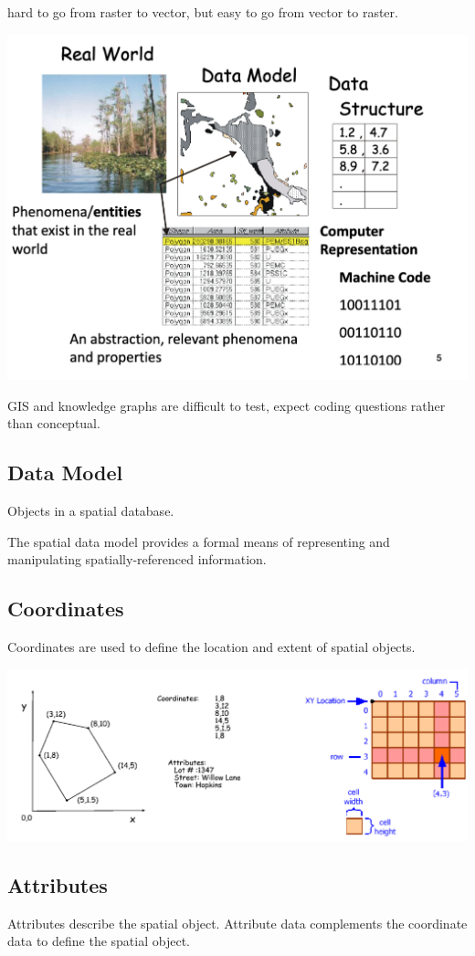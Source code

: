 \documentclass[11pt]{article}
\theoremstyle{definition}
\begin{document}
hard to go from raster to vector, but easy to go from vector to raster.

\includegraphics[width=\textwidth/2]{3.png}

GIS and knowledge graphs are difficult to test, expect coding questions rather than conceptual.

\subsection{Data Model}
Objects in a spatial
database.

The spatial data
model provides a
formal means of
representing and
manipulating
spatially-referenced
information.

\subsection{Coordinates}
Coordinates are used to define the
location and extent of spatial objects.

\includegraphics[width=\textwidth/2]{4.png}

\subsection{Attributes}
Attributes describe the spatial object.
Attribute data complements the coordinate
data to define the spatial object.
\end{document}
